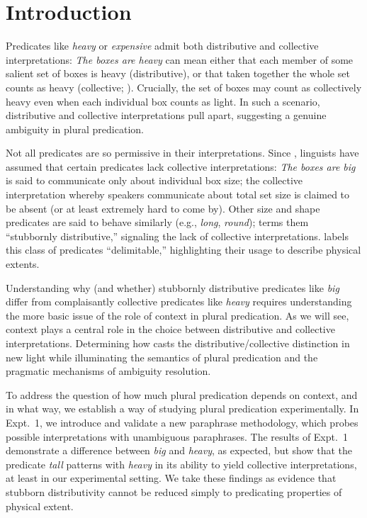 \documentclass[linguex]{sp}
\begin{document}
\section{Introduction}

Predicates like \textit{heavy} or \textit{expensive} admit both distributive and collective interpretations: \textit{The boxes are heavy} can mean either that each member of some salient set of boxes is heavy (distributive), or that taken together the whole set counts as heavy (collective; \citealp{scha1984}). Crucially, the set of boxes may count as collectively heavy even when each individual box counts as light. In such a scenario, distributive and collective interpretations pull apart, suggesting a genuine ambiguity in plural predication.

Not all predicates are so permissive in their interpretations. Since \citet[140]{quine1960}, linguists have assumed that certain predicates lack collective interpretations: \textit{The boxes are big} is said to communicate only about individual box size; the collective interpretation whereby speakers communicate about total set size is claimed to be absent (or at least extremely hard to come by). Other size and shape predicates are said to behave similarly (e.g., \emph{long}, \emph{round}); \cite{schwarzschild2011} terms them ``stubbornly distributive,'' signaling the lack of collective interpretations. \citet{zhang2013} labels this class of predicates ``delimitable,'' highlighting their usage to describe physical extents.

Understanding why (and whether) stubbornly distributive predicates like \emph{big} differ from complaisantly collective predicates like \emph{heavy} requires understanding the more basic issue of the role of context in plural predication. As we will see, context plays a central role in the choice between distributive and collective interpretations. Determining how casts the distributive/collective distinction in new light while illuminating the semantics of plural predication and the pragmatic mechanisms of ambiguity resolution. 

To address the question of how much plural predication depends on context, and in what way, we establish a way of studying plural predication experimentally. In Expt.~1, we introduce and validate a new paraphrase methodology, which probes possible interpretations with unambiguous paraphrases. The results of Expt.~1 demonstrate a difference between \emph{big} and \emph{heavy}, as expected, but show that the predicate \emph{tall} patterns with \emph{heavy} in its ability to yield collective interpretations, at least in our experimental setting. We take these findings as evidence that stubborn distributivity cannot be reduced simply to predicating properties of physical extent.
\end{document}
